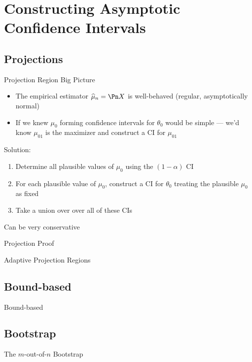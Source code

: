 \documentclass[aspectratio=169, professionalfonts]{beamer}
\begin{document}
\section{Constructing Asymptotic Confidence Intervals}
\subsection{Projections}
\begin{frame}{Projection Region Big Picture}
	\begin{itemize}
		\item The empirical estimator $\widehat{\mu}_n = \Pn X$ is well-behaved (regular, asymptotically normal)
		      \vfill \pause
		\item If we knew $\mu_0$ forming confidence intervals for ${\theta}_0$
		      would be simple --- we'd know $\mu_{01}$ is the maximizer and
		      construct a CI for $\mu_{01}$
	\end{itemize}
	\vfill \pause
	Solution:
	\begin{enumerate}
		\item Determine all plausible values of $\mu_0$ using the $(1- \alpha)$ CI
		\item For each plausible value of $\mu_0$, construct a CI for ${\theta}_0$
		      treating the plausible $\mu_0$ as fixed
		\item Take a union over over all of these CIs
	\end{enumerate}
	\vfill \pause
	Can be very conservative

\end{frame}

\begin{frame}{Projection Proof}
\end{frame}

\begin{frame}{Adaptive Projection Regions}

\end{frame}
\subsection{Bound-based}
\begin{frame}{Bound-based}
\end{frame}
\subsection{Bootstrap}
\begin{frame}{The $m$-out-of-$n$ Bootstrap}
\end{frame}
\end{document}
